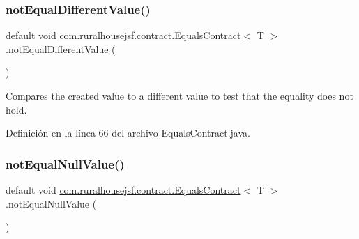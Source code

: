 \mbox{\label{interfacecom_1_1ruralhousejsf_1_1contract_1_1_equals_contract_acaa5c1c071bf63a3e629977c73131fc8}} 
\subsubsection{\texorpdfstring{notEqualDifferentValue()}{notEqualDifferentValue()}}
{\footnotesize\ttfamily default void \mbox{\hyperlink{interfacecom_1_1ruralhousejsf_1_1contract_1_1_equals_contract}{com.\+ruralhousejsf.\+contract.\+Equals\+Contract}}$<$ T $>$.not\+Equal\+Different\+Value (\begin{DoxyParamCaption}{ }\end{DoxyParamCaption})}



Compares the created value to a different value to test that the equality does not hold. 



Definición en la línea 66 del archivo Equals\+Contract.\+java.

\mbox{\label{interfacecom_1_1ruralhousejsf_1_1contract_1_1_equals_contract_adda6a50dc1babeb3783fd92a09aac788}} 
\subsubsection{\texorpdfstring{notEqualNullValue()}{notEqualNullValue()}}
{\footnotesize\ttfamily default void \mbox{\hyperlink{interfacecom_1_1ruralhousejsf_1_1contract_1_1_equals_contract}{com.\+ruralhousejsf.\+contract.\+Equals\+Contract}}$<$ T $>$.not\+Equal\+Null\+Value (\begin{DoxyParamCaption}{ }\end{DoxyParamCaption})}



